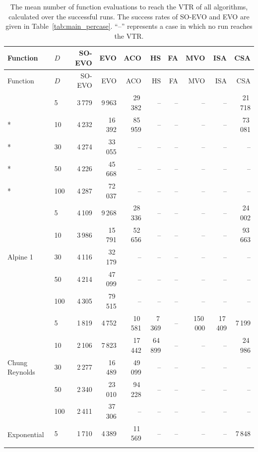 {\footnotesize\setlength{\tabcolsep}{3pt}\setlength{\LTcapwidth}{\textwidth}\renewcommand{\arraystretch}{0.97}
\begin{longtable}{llrrrrrrrr}
\caption{The mean number of function evaluations to reach the VTR of all algorithms, calculated over the successful runs. The success rates of SO-EVO and EVO are given in Table~\ref{tab:main_percase}. ``--'' represents a case in which no run reaches the VTR.}\label{tab:field_full}\\
\toprule
Function & $D$ & SO-EVO & EVO & ACO & HS & FA & MVO & ISA & CSA \\
\midrule
\endfirsthead
\toprule
Function & $D$ & SO-EVO & EVO & ACO & HS & FA & MVO & ISA & CSA \\
\midrule
\endhead
\bottomrule
\endfoot
\multirow{5}{*}{Ackley 1} & 5 & 3\,779 & 9\,963 & 29\,382 & -- & -- & -- & -- & 21\,718 \\*
 & 10 & 4\,232 & 16\,392 & 85\,959 & -- & -- & -- & -- & 73\,081 \\*
 & 30 & 4\,274 & 33\,055 & -- & -- & -- & -- & -- & -- \\*
 & 50 & 4\,226 & 45\,668 & -- & -- & -- & -- & -- & -- \\*
 & 100 & 4\,287 & 72\,037 & -- & -- & -- & -- & -- & -- \\
\midrule
\multirow{5}{*}{Alpine 1} & 5 & 4\,109 & 9\,268 & 28\,336 & -- & -- & -- & -- & 24\,002 \\*
 & 10 & 3\,986 & 15\,791 & 52\,656 & -- & -- & -- & -- & 93\,663 \\*
 & 30 & 4\,116 & 32\,179 & -- & -- & -- & -- & -- & -- \\*
 & 50 & 4\,214 & 47\,099 & -- & -- & -- & -- & -- & -- \\*
 & 100 & 4\,305 & 79\,515 & -- & -- & -- & -- & -- & -- \\
\midrule
\multirow{5}{*}{Chung Reynolds} & 5 & 1\,819 & 4\,752 & 10\,581 & 7\,369 & -- & 150\,000 & 17\,409 & 7\,199 \\*
 & 10 & 2\,106 & 7\,823 & 17\,442 & 64\,899 & -- & -- & -- & 24\,986 \\*
 & 30 & 2\,277 & 16\,489 & 49\,099 & -- & -- & -- & -- & -- \\*
 & 50 & 2\,340 & 23\,010 & 94\,228 & -- & -- & -- & -- & -- \\*
 & 100 & 2\,411 & 37\,306 & -- & -- & -- & -- & -- & -- \\
\midrule
\multirow{5}{*}{Exponential} & 5 & 1\,710 & 4\,389 & 11\,569 & -- & -- & -- & -- & 7\,848 \\*

\end{longtable}}
